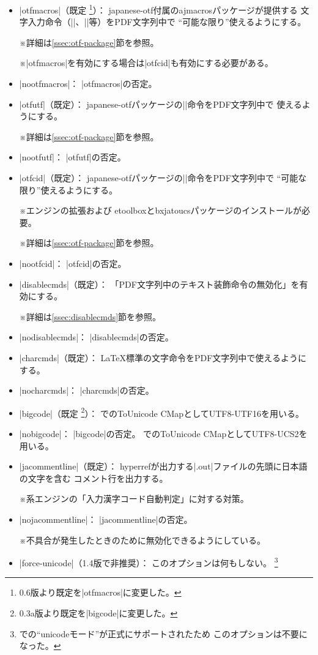 \documentclass[uplatex,dvipdfmx,a4paper]{jsarticle}
\renewcommand{\headfont}{\gtfamily\romanseries{sbc}\sffamily}
\newcommand{\Pkg}[1]{\textsf{#1}}
\newcommand{\Note}{\par\noindent ※}
\newcommand{\Means}{：\quad}
\newcommand{\／}{\mbox{}／\mbox{}}
\providecommand{\Strong}[1]{{\headfont#1}}
\begin{document}
\begin{itemize}
\item |otfmacros|（既定
  \footnote{0.6版より既定を|otfmacros|に変更した。}）\Means
  \Pkg{japanese-otf}付属の\Pkg{ajmacros}パッケージが提供する
  文字入力命令（|\ajMaru|、|\ajLig|等）をPDF文字列中で
  “可能な限り”使えるようにする。
  \Note 詳細は\ref{ssec:otf-package}節を参照。
  \Note |otfmacros|を有効にする場合は|otfcid|も有効にする必要がある。
\item |nootfmacros|\Means
  |otfmacros|の否定。
\item |otfutf|（既定）\Means
  \Pkg{japanese-otf}パッケージの|\UTF|命令をPDF文字列中で
  使えるようにする。
  \Note 詳細は\ref{ssec:otf-package}節を参照。
\item |nootfutf|\Means
  |otfutf|の否定。
\item |otfcid|（既定）\Means
  \Pkg{japanese-otf}パッケージの|\CID|命令をPDF文字列中で
  “可能な限り”使えるようにする。
  \Note エンジンの{\eTeX}拡張および
  \Pkg{etoolbox}と\Pkg{bxjatoucs}パッケージのインストールが必要。
  \Note 詳細は\ref{ssec:otf-package}節を参照。
\item |nootfcid|\Means
  |otfcid|の否定。
\item |disablecmds|（既定）\Means
  「PDF文字列中のテキスト装飾命令の無効化」を有効にする。
  \Note 詳細は\ref{ssec:disablecmds}節を参照。
\item |nodisablecmds|\Means
  |disablecmds|の否定。
\item |charcmds|（既定）\Means
  {\LaTeX}標準の文字命令をPDF文字列中で使えるようにする。
\item |nocharcmds|\Means
  |charcmds|の否定。
\item |bigcode|（既定
  \footnote{0.3a版より既定を|bigcode|に変更した。}）\Means
  {\upTeX}でのToUnicode CMapとしてUTF8-UTF16を用いる。
\item |nobigcode|\Means
  |bigcode|の否定。
  {\upTeX}でのToUnicode CMapとしてUTF8-UCS2を用いる。
\item |jacommentline|（既定）\Means
  \Pkg{hyperref}が出力する|.out|ファイルの先頭に日本語の文字を含む
  コメント行を出力する。
  \Note {\pTeX}系エンジンの「入力漢字コード自動判定」に対する対策。
\item |nojacommentline|\Means
  |jacommentline|の否定。
  \Note 不具合が発生したときのために無効化できるようにしている。
\item |force-unicode|（1.4版で\Strong{非推奨}）\Means
  このオプションは何もしない。
  \footnote{{\pLaTeX}での“unicodeモード”が正式にサポートされたため
    このオプションは不要になった。}
\end{itemize}
\end{document}

